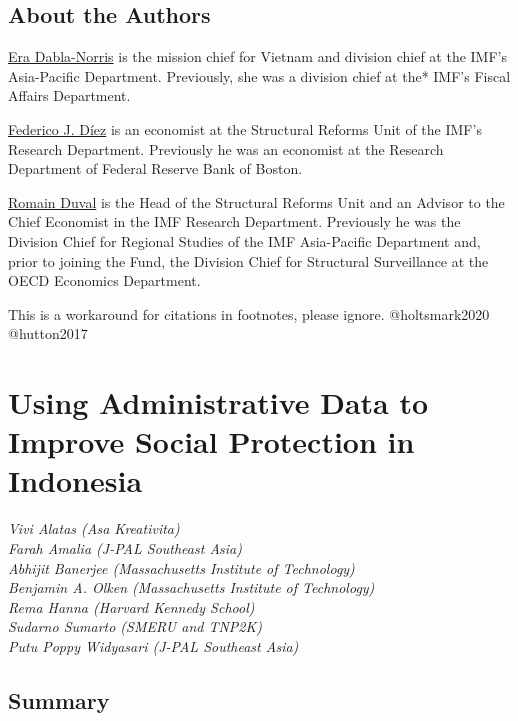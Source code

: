 \documentclass[
]{WileySix}
\begin{document}
\hypertarget{about-the-authors-8}{%
\subsection*{About the Authors}\label{about-the-authors-8}}

\href{https://www.imf.org/external/np/cv/AuthorCV.aspx?AuthID=299}{Era Dabla-Norris} is the mission chief for Vietnam and division chief at the IMF's Asia-Pacific Department. Previously, she was a division chief at the* IMF's Fiscal Affairs Department.

\href{https://www.imf.org/external/np/cv/AuthorCV.aspx?AuthID=311}{Federico J. Díez} is an economist at the Structural Reforms Unit of the IMF's Research Department. Previously he was an economist at the Research Department of Federal Reserve Bank of Boston.

\href{https://www.imf.org/external/np/cv/AuthorCV.aspx?AuthID=291}{Romain Duval} is the Head of the Structural Reforms Unit and an Advisor to the Chief Economist in the IMF Research Department. Previously he was the Division Chief for Regional Studies of the IMF Asia-Pacific Department and, prior to joining the Fund, the Division Chief for Structural Surveillance at the OECD Economics Department.

\begin{invisible}
This is a workaround for citations in footnotes, please ignore.
@holtsmark2020 @hutton2017
\end{invisible}

\hypertarget{indonesia}{%
\section{Using Administrative Data to Improve Social Protection in Indonesia}\label{indonesia}}

\emph{Vivi Alatas (Asa Kreativita)}\\
\emph{Farah Amalia (J-PAL Southeast Asia)}\\
\emph{Abhijit Banerjee (Massachusetts Institute of Technology)}\\
\emph{Benjamin A. Olken (Massachusetts Institute of Technology)}\\
\emph{Rema Hanna (Harvard Kennedy School)}\\
\emph{Sudarno Sumarto (SMERU and TNP2K)}\\
\emph{Putu Poppy Widyasari (J-PAL Southeast Asia)}

\hypertarget{summary-10}{%
\subsection{Summary}\label{summary-10}}
\end{document}
